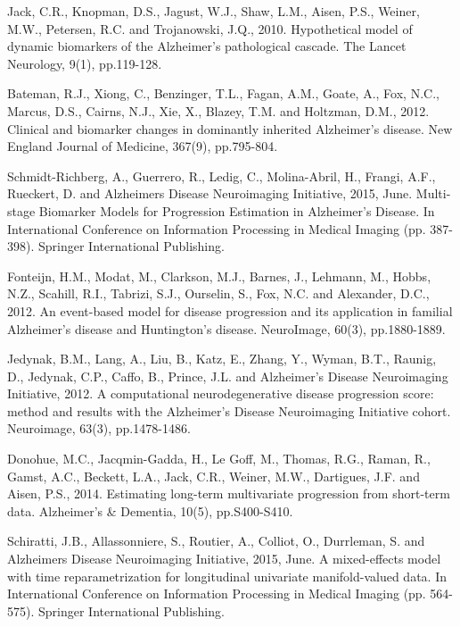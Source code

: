 \documentclass{llncs}
\begin{document}

\begin{thebibliography}{5}

Jack, C.R., Knopman, D.S., Jagust, W.J., Shaw, L.M., Aisen, P.S., Weiner, M.W., Petersen, R.C. and Trojanowski, J.Q., 2010. Hypothetical model of dynamic biomarkers of the Alzheimer's pathological cascade. The Lancet Neurology, 9(1), pp.119-128.

Bateman, R.J., Xiong, C., Benzinger, T.L., Fagan, A.M., Goate, A., Fox, N.C., Marcus, D.S., Cairns, N.J., Xie, X., Blazey, T.M. and Holtzman, D.M., 2012. Clinical and biomarker changes in dominantly inherited Alzheimer's disease. New England Journal of Medicine, 367(9), pp.795-804.

Schmidt-Richberg, A., Guerrero, R., Ledig, C., Molina-Abril, H., Frangi, A.F., Rueckert, D. and Alzheimers Disease Neuroimaging Initiative, 2015, June. Multi-stage Biomarker Models for Progression Estimation in Alzheimer’s Disease. In International Conference on Information Processing in Medical Imaging (pp. 387-398). Springer International Publishing.

Fonteijn, H.M., Modat, M., Clarkson, M.J., Barnes, J., Lehmann, M., Hobbs, N.Z., Scahill, R.I., Tabrizi, S.J., Ourselin, S., Fox, N.C. and Alexander, D.C., 2012. An event-based model for disease progression and its application in familial Alzheimer's disease and Huntington's disease. NeuroImage, 60(3), pp.1880-1889.

Jedynak, B.M., Lang, A., Liu, B., Katz, E., Zhang, Y., Wyman, B.T., Raunig, D., Jedynak, C.P., Caffo, B., Prince, J.L. and Alzheimer's Disease Neuroimaging Initiative, 2012. A computational neurodegenerative disease progression score: method and results with the Alzheimer's Disease Neuroimaging Initiative cohort. Neuroimage, 63(3), pp.1478-1486.

Donohue, M.C., Jacqmin-Gadda, H., Le Goff, M., Thomas, R.G., Raman, R., Gamst, A.C., Beckett, L.A., Jack, C.R., Weiner, M.W., Dartigues, J.F. and Aisen, P.S., 2014. Estimating long-term multivariate progression from short-term data. Alzheimer's \& Dementia, 10(5), pp.S400-S410.

Schiratti, J.B., Allassonniere, S., Routier, A., Colliot, O., Durrleman, S. and Alzheimers Disease Neuroimaging Initiative, 2015, June. A mixed-effects model with time reparametrization for longitudinal univariate manifold-valued data. In International Conference on Information Processing in Medical Imaging (pp. 564-575). Springer International Publishing.


\end{thebibliography}
\end{document}
